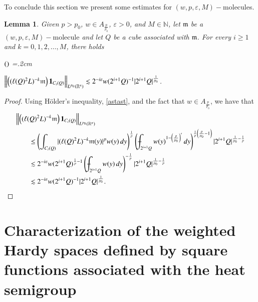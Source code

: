 \documentclass[11pt, a4paper,leqno]{amsart}
\newcommand{\mm}{\mathfrak{m}}
\def\Xint#1{\mathchoice
    {\XXint\displaystyle\textstyle{#1}}%
    {\XXint\textstyle\scriptstyle{#1}}%
    {\XXint\scriptstyle\scriptscriptstyle{#1}}%
    {\XXint\scriptscriptstyle\scriptscriptstyle{#1}}%
    \!\int}
\def\XXint#1#2#3{{\setbox0=\hbox{$#1{#2#3}{\int}$}
    \vcenter{\hbox{$#2#3$}}\kern-.5\wd0}}
\def\dashint{\Xint-}
\def\Xint#1{\mathchoice
    {\XXint\displaystyle\textstyle{#1}}%
    {\XXint\textstyle\scriptstyle{#1}}%
    {\XXint\scriptstyle\scriptscriptstyle{#1}}%
    {\XXint\scriptscriptstyle\scriptscriptstyle{#1}}%
    \!\int}
\def\XXint#1#2#3{{\setbox0=\hbox{$#1{#2#3}{\int}$}
    \vcenter{\hbox{$#2#3$}}\kern-.5\wd0}}
\renewcommand{\chi}{{\bf 1}}
\theoremstyle{plain}
\newtheorem{lemma}[equation]{Lemma}
\theoremstyle{definition}
\theoremstyle{remark}
\numberwithin{equation}{section}
\def \R{ \mathbb{R} }
\def \N{ \mathbb{N} }
\def \mol{ (w,p,\varepsilon,M)-\textrm{molecule}}
\begin{document}
%

















To conclude this section we present some estimates for $\mol$s.
\begin{lemma}\label{lemma:m-h}
Given $p>p_0$,  $w\in A_{\frac{p}{p_0}}$, $\varepsilon>0$, and $M\in \N$, let $\mm$ be a $\mol$ and let $Q$ be a cube associated with $\mm$.  For every $i\geq 1$ and $k=0,1,2,\ldots, M$, there holds
\begin{list}{$(\theenumi)$}{\leftmargin=1cm \itemsep=0.2cm\topsep=.2cm \renewcommand{\theenumi}{\alph{enumi}}}

\item[]  $\left\|\left((\ell(Q)^2L)^{-k}\mm\right)\chi_{C_i(Q)}\right\|_{L^{p_0}(\R^n)}\lesssim 2^{-i\varepsilon}w(2^{i+1}Q)^{-1}|2^{i+1}Q|^{\frac{1}{p_0}}$.
\end{list}
\end{lemma}
\begin{proof}
 Using H\"older's inequality, \eqref{astast}, and the fact that $w\in A_{\frac{p}{p_0}}$, we have that
\begin{align*}
&\left\|\left((\ell(Q)^2L)^{-k}\mm\right)\chi_{C_i(Q)}\right\|_{L^{p_0}(\mathbb{R}^n)}
\\
&\qquad\leq \left(\int_{C_i(Q)}|(\ell(Q)^2L)^{-k}\mm(y)|^{p}w(y) \, dy\right)^{\frac{1}{p}}
\left(\dashint_{2^{i+1}Q}w(y)^{1-\left(\frac{p}{p_0}\right)'} \, dy\right)^{\frac{1}{p}\left(\frac{p}{p_0}-1\right)}|2^{i+1}Q|^{
\frac{1}{p_0}-\frac{1}{p}}
\\
&\qquad\lesssim 2^{-i\varepsilon}w(2^{i+1}Q)^{\frac{1}{p}-1}
\left(\dashint_{2^{i+1}Q}w(y) \, dy\right)^{-\frac{1}{p}}|2^{i+1}Q|^{
\frac{1}{p_0}-\frac{1}{p}}
\\
& \qquad\lesssim 2^{-i\varepsilon}
w(2^{i+1}Q)^{-1}|2^{i+1}Q|^{\frac{1}{p_0}}.
\end{align*}
\end{proof}

\section{Characterization of the weighted Hardy spaces defined by square functions associated with the heat semigroup}\label{SH}
\end{document}
